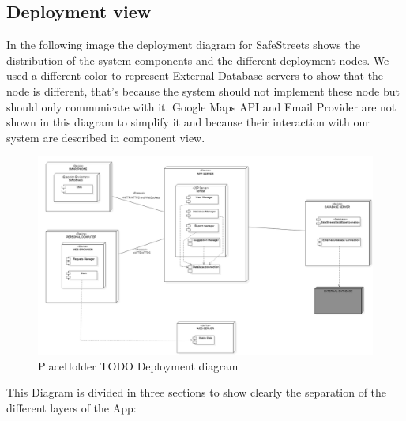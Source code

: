 \subsection{Deployment view}
In the following image the deployment diagram for SafeStreets shows the distribution of the system components and the different deployment nodes. We used a different color to represent External Database servers to show that the node is different, that's because the system should not implement these node but should only communicate with it.
Google Maps API and Email Provider are not shown in this diagram to simplify it and because their interaction with our system are described in component view.
\newline
\begin{figure}[H]
\centering
\includegraphics[width=\textwidth]{Images/Deployment.png}
\caption{\label{fig:ComWI}PlaceHolder TODO Deployment diagram}
\end{figure}
This Diagram is divided in three sections to show clearly the separation of the different layers of the App:
